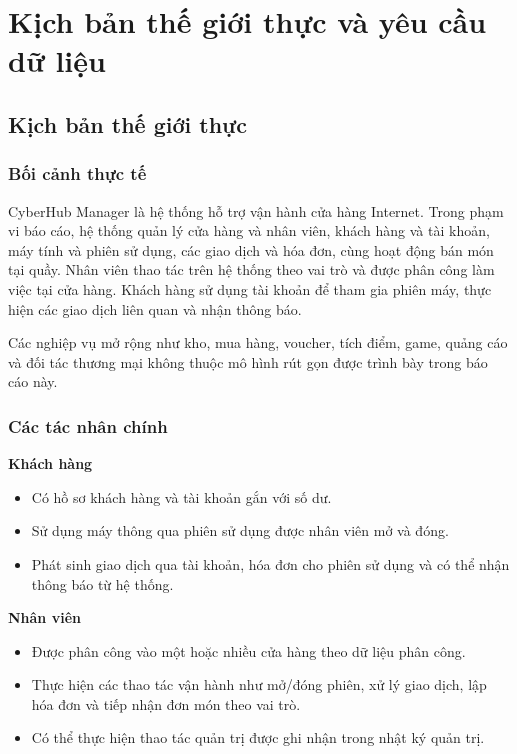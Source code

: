 \chapter{Kịch bản thế giới thực và yêu cầu dữ liệu}

\section{Kịch bản thế giới thực}

\subsection{Bối cảnh thực tế}
CyberHub Manager là hệ thống hỗ trợ vận hành cửa hàng Internet. Trong phạm vi báo cáo, hệ thống quản lý cửa hàng và nhân viên, khách hàng và tài khoản, máy tính và phiên sử dụng, các giao dịch và hóa đơn, cùng hoạt động bán món tại quầy. Nhân viên thao tác trên hệ thống theo vai trò và được phân công làm việc tại cửa hàng. Khách hàng sử dụng tài khoản để tham gia phiên máy, thực hiện các giao dịch liên quan và nhận thông báo.

Các nghiệp vụ mở rộng như kho, mua hàng, voucher, tích điểm, game, quảng cáo và đối tác thương mại không thuộc mô hình rút gọn được trình bày trong báo cáo này.

\subsection{Các tác nhân chính}
\textbf{Khách hàng}
\begin{itemize}
  \item Có hồ sơ khách hàng và tài khoản gắn với số dư.
  \item Sử dụng máy thông qua phiên sử dụng được nhân viên mở và đóng.
  \item Phát sinh giao dịch qua tài khoản, hóa đơn cho phiên sử dụng và có thể nhận thông báo từ hệ thống.
\end{itemize}

\textbf{Nhân viên}
\begin{itemize}
  \item Được phân công vào một hoặc nhiều cửa hàng theo dữ liệu phân công.
  \item Thực hiện các thao tác vận hành như mở/đóng phiên, xử lý giao dịch, lập hóa đơn và tiếp nhận đơn món theo vai trò.
  \item Có thể thực hiện thao tác quản trị được ghi nhận trong nhật ký quản trị.
\end{itemize}

